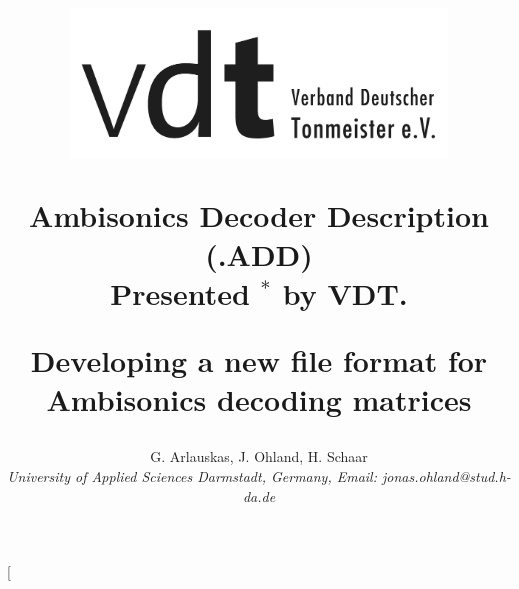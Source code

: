 \documentclass[a4paper, 10pt, twocolumn]{article}
\begin{document}
\fancyhf{} %

\chead{\underline{\sffamily\large\textcolor{gray}{5th International Conference on Spatial Audio ICSA, September 2019}}}
\renewcommand{\headrulewidth}{0pt}
\rhead{}
\renewcommand{\headrulewidth}{0pt}
\rhead{}


\date{}											%

\title{
\vspace{-5mm}%
\mbox{\includegraphics[height=4cm]{VDT}}
%
\vspace{7mm}%
%
\begin{center}
\textbf{\Huge Ambisonics Decoder Description (.ADD)}\\
{ Presented  $^*$ by VDT.}
\end{center}
\vspace{10mm}%
\begin{center}
\textbf\mdseries Developing a new file format for Ambisonics decoding matrices
\end{center}
%
\mbox{}\vspace{-11mm}
%
}

\author{ %
%
G. Arlauskas, J. Ohland, H. Schaar\\
%
\textit{\large %
University of Applied Sciences Darmstadt, Germany, Email: jonas.ohland@stud.h-da.de
}\\
%
}
%

\twocolumn[
\maketitle
\thispagestyle{fancy}
%
\end{document}
